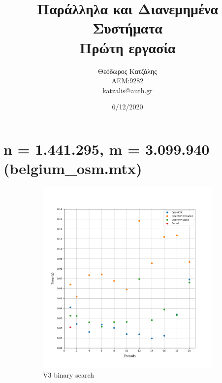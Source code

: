 \documentclass[12pt, a4paper]{article}
\title{\textbf{Παράλληλα και Διανεμημένα Συστήματα \\ Πρώτη εργασία}}
\author{Θεόδωρος Κατζάλης \\ ΑΕΜ:9282 \\ katzalis@auth.gr}
\date{6/12/2020}
\begin{document}
\sloppy
%
\maketitle


\tableofcontents

\vspace{1cm}

\section{n = 1.441.295, m = 3.099.940 (belgium\_osm.mtx)}

\begin{figure}[h!]
     \begin{subfigure}[b]{0.33\textwidth}
         \centering
         \includegraphics[height=.4\textheight, width=\textwidth, keepaspectratio]{assets/belgium/v3.png}
    \caption{V3 binary search}
     \end{subfigure}
     \hfill
     \begin{subfigure}[b]{0.33\textwidth}
         \centering

\end{subfigure}
\end{figure}
\end{document}
